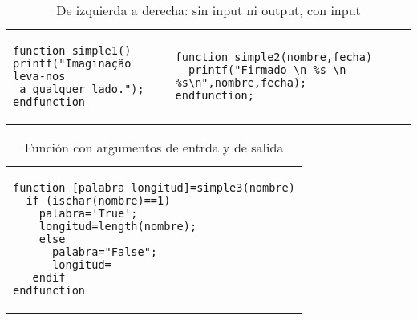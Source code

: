 \begin{table}[!ht] 
\begin{mybox}%
\begin{tabular}{l|l}
    \begin{minipage}{0.4\linewidth}
\begin{verbatim} 
function simple1()
printf("Imaginação leva-nos
 a qualquer lado.");
endfunction
\end{verbatim}
\end{minipage}&
    \begin{minipage}{0.6\linewidth}
\begin{verbatim} 
function simple2(nombre,fecha)
  printf("Firmado \n %s \n %s\n",nombre,fecha);
endfunction;
\end{verbatim}    
    \end{minipage}\\
 \end{tabular}
\end{mybox}\caption{De izquierda a derecha: sin input ni output, con input}\label{tab:function}
\end{table}

\begin{table}[!ht] 
\begin{mybox}%
\begin{tabular}{l}
    \begin{minipage}{1\linewidth}
\begin{verbatim} 
function [palabra longitud]=simple3(nombre)
  if (ischar(nombre)==1)
    palabra='True';
    longitud=length(nombre);
    else
      palabra="False";
      longitud=
   endif
endfunction
\end{verbatim}    
\end{minipage}\\
 \end{tabular}
\end{mybox}\caption{Función con argumentos de entrda y de salida}\label{tab:function}
\end{table}

